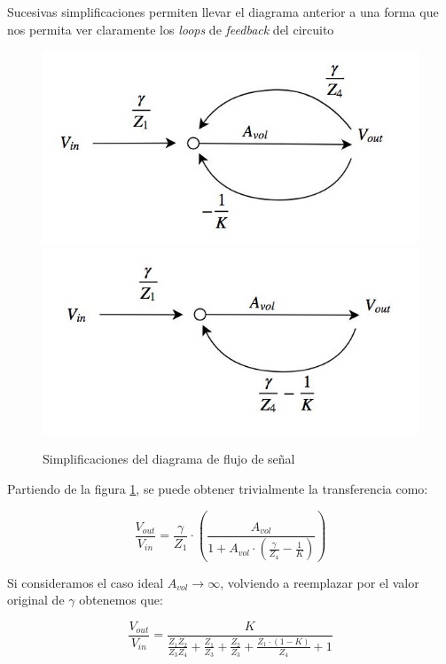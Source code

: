 \documentclass[../../tc_tp5_main.tex]{subfiles}
\begin{document}
Sucesivas simplificaciones permiten llevar el diagrama anterior a una forma que nos permita ver claramente los \textit{loops} de \textit{feedback} del circuito

\begin{figure}[H]
	\centering
	\includegraphics[scale=0.5]{imagenes/tc_tp1_ej1_df_2.jpg}\\
	\includegraphics[scale=0.5]{imagenes/tc_tp1_ej1_df_3.jpg}	
	\caption{Simplificaciones del diagrama de flujo de se\~nal}
	\label{fig:1-flujo-de-senal}
\end{figure}

Partiendo de la figura \ref{fig:1-flujo-de-senal}, se puede obtener trivialmente la transferencia como:

\begin{equation}
	\frac{V_{out}}{V_{in}} = \frac{\gamma}{Z_1} \cdot \left( \frac{A_{vol}}{1 + A_{vol} \cdot \left( \frac{\gamma}{Z_4} - \frac{1}{K} \right)} \right)
	\label{eq:1-tf-sk-generica-avol}
\end{equation}

Si consideramos el caso ideal $A_{vol} \to \infty$, volviendo a reemplazar por el valor original de $\gamma$ obtenemos que:

\begin{equation}
	\frac{V_{out}}{V_{in}} = \frac{K}{ \frac{Z_1 Z_2}{Z_3 Z_4} + \frac{Z_1}{Z_3} + \frac{Z_2}{Z_3} + \frac{Z_1 \cdot (1-K)}{Z_4} + 1} 
	\label{eq:1-tf-sk-generica}
\end{equation}
\end{document}
